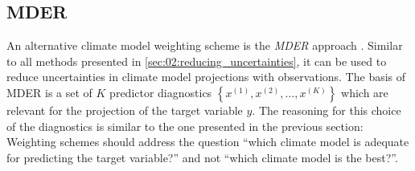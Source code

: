 \subsection{\acl{MDER}}
\label{subsec:02:mder}

An alternative climate model weighting scheme is the \emph{\ac{MDER}} approach
\autocite{Karpechko2013}. Similar to all methods presented in
\cref{sec:02:reducing_uncertainties}, it can be used to reduce uncertainties in
climate model projections with observations. The basis of \ac{MDER} is a set of
$K$ predictor diagnostics $\left\{ x^{(1)}, x^{(2)}, \ldots, x^{(K)} \right\}$
which are relevant for the projection of the target variable $y$. The reasoning
for this choice of the diagnostics is similar to the one presented in the
previous section: Weighting schemes should address the question \enquote{which
  climate model is adequate for predicting the target variable?} and not
\enquote{which climate model is the best?}.

